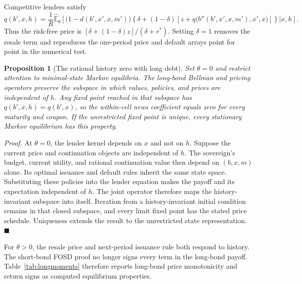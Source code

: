 \documentclass[11pt]{article}
\newtheorem{proposition}{Proposition}
\theoremstyle{definition}
\newcommand{\E}{\mathbb{E}}
\newcommand{\Ehat}{\widehat{\E}}
\begin{document}
Competitive lenders satisfy
\[
q(b',x,h)=\frac{1}{R}\Ehat_\theta\!\left[
\bigl(1-d(b',x',x,m')\bigr)
\left\{\delta+(1-\delta)\left[z+q\bigl(b''(b',x',x,m'),x',x\bigr)\right]\right\}
\mathrel{\Big|}x,h\right].
\]
Thus the risk-free price is $[\delta+(1-\delta)z]/(\delta+r^*)$. Setting $\delta=1$ removes the resale term and reproduces the one-period price and default arrays point for point in the numerical test.

\begin{proposition}[The rational history zero with long debt]\label{prop:longzero}
Set $\theta=0$ and restrict attention to minimal-state Markov equilibria. The long-bond Bellman and pricing operators preserve the subspace in which values, policies, and prices are independent of $h$. Any fixed point reached in that subspace has $q(b',x,h)=q(b',x)$, so the within-cell news coefficient equals zero for every maturity and coupon. If the unrestricted fixed point is unique, every stationary Markov equilibrium has this property.
\end{proposition}

\noindent\textit{Proof.} At $\theta=0$, the lender kernel depends on $x$ and not on $h$. Suppose the current price and continuation objects are independent of $h$. The sovereign's budget, current utility, and rational continuation value then depend on $(b,x,m)$ alone. Its optimal issuance and default rules inherit the same state space. Substituting these policies into the lender equation makes the payoff and its expectation independent of $h$. The joint operator therefore maps the history-invariant subspace into itself. Iteration from a history-invariant initial condition remains in that closed subspace, and every limit fixed point has the stated price schedule. Uniqueness extends the result to the unrestricted state representation. $\blacksquare$

For $\theta>0$, the resale price and next-period issuance rule both respond to history. The short-bond FOSD proof no longer signs every term in the long-bond payoff. Table~\ref{tab:longmoments} therefore reports long-bond price monotonicity and return signs as computed equilibrium properties.
\end{document}
